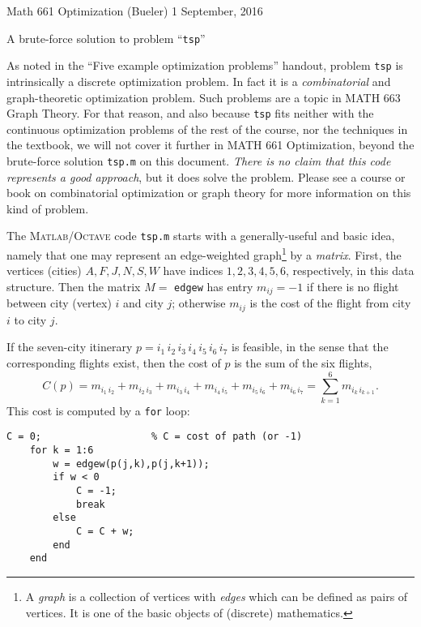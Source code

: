 \documentclass[11pt]{amsart}
\newcommand{\Matlab}{\textsc{Matlab}\xspace}
\newcommand{\Octave}{\textsc{Octave}\xspace}
\begin{document}
\scriptsize \noindent Math 661 Optimization (Bueler) \hfill 1 September, 2016
\normalsize

\medskip\bigskip
\Large
\centerline{A brute-force solution to problem ``\texttt{tsp}''}

\bigskip\medskip
\normalsize

\thispagestyle{empty}

As noted in the ``Five example optimization problems'' handout, problem \texttt{tsp} is intrinsically a discrete optimization problem.  In fact it is a \emph{combinatorial} and graph-theoretic optimization problem.  Such problems are a topic in MATH 663 Graph Theory.  For that reason, and also because \texttt{tsp} fits neither with the continuous optimization problems of the rest of the course, nor the techniques in the textbook, we will not cover it further in MATH 661 Optimization, beyond the brute-force solution \texttt{tsp.m} on this document.  \emph{There is no claim that this code represents a good approach}, but it does solve the problem.  Please see a course or book on combinatorial optimization or graph theory for more information on this kind of problem.

The \Matlab/\Octave code \texttt{tsp.m} starts with a generally-useful and basic idea, namely that one may represent an edge-weighted graph\footnote{A \emph{graph} is a collection of vertices with \emph{edges} which can be defined as pairs of vertices.  It is one of the basic objects of (discrete) mathematics.} by a \emph{matrix}.  First, the vertices (cities) $A,F,J,N,S,W$ have indices $1,2,3,4,5,6$, respectively, in this data structure.  Then the matrix $M=$ \texttt{edgew} has entry $m_{ij}=-1$ if there is no flight between city (vertex) $i$ and city $j$; otherwise $m_{ij}$ is the cost of the flight from city $i$ to city $j$.

If the seven-city itinerary $p = i_1\,i_2\,i_3\,i_4\,i_5\,i_6\,i_7$ is feasible, in the sense that the corresponding flights exist, then the cost of $p$ is the sum of the six flights,
    $$C(p) = m_{i_1\, i_2} + m_{i_2\, i_3} + m_{i_3\, i_4} + m_{i_4\, i_5} + m_{i_5\, i_6} + m_{i_6\, i_7} = \sum_{k=1}^6 m_{i_k\,i_{k+1}}.$$
This cost is computed by a \texttt{for} loop:

\medskip
\begin{Verbatim}[fontfamily=courier,fontsize=\scriptsize]
    C = 0;                   % C = cost of path (or -1)
    for k = 1:6
        w = edgew(p(j,k),p(j,k+1));
        if w < 0
            C = -1;
            break
        else
            C = C + w;
        end
    end
\end{Verbatim}
\end{document}
